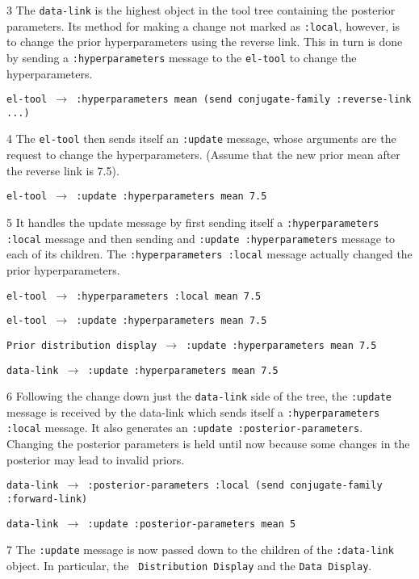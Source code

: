 \item{3} The {\tt data-link\/} is the highest object in the tool tree
containing the posterior parameters.  Its method for making a change
not marked as {\tt :local\/}, however, is to change the prior
hyperparameters using the reverse link.  This in turn is done by
sending a {\tt :hyperparameters\/} message to the {\tt el-tool\/} to
change the hyperparameters.

{\tt el-tool $\rightarrow$ :hyperparameters mean (send conjugate-family
:reverse-link ...)}

\item{4} The {\tt el-tool\/} then sends itself an {\tt :update\/}
message, whose arguments are the request to change 
the hyperparameters.  (Assume that the new prior mean after the
reverse link is 7.5).

{\tt el-tool $\rightarrow$ :update :hyperparameters mean 7.5}


\item{5} It handles the update message by first sending
itself a {\tt :hyperparameters :local\/} message and then sending and
{\tt :update :hyperparameters\/} message to each of its children.  The
{\tt :hyperparameters :local\/} message actually changed the prior
hyperparameters.  

{\tt el-tool $\rightarrow$ :hyperparameters :local mean 7.5}\par
{\tt el-tool $\rightarrow$ :update :hyperparameters mean 7.5}\par
{\tt Prior distribution display $\rightarrow$ :update :hyperparameters mean 7.5}\par
{\tt data-link $\rightarrow$ :update :hyperparameters mean 7.5}\par

\item{6} Following the change down just the {\tt data-link} side of
the tree, the {\tt :update\/} message is
received by the data-link which sends itself a {\tt :hyperparameters
:local\/} message.  It also generates an {\tt :update
:posterior-parameters\/}.  Changing the posterior parameters is held
until now because some changes in the posterior may lead to invalid
priors.  

{\tt data-link $\rightarrow$ :posterior-parameters :local (send
conjugate-family :forward-link)}\par
{\tt data-link $\rightarrow$ :update :posterior-parameters mean 5}

\item{7} The {\tt :update\/} message is now passed down to the
children of the {\tt :data-link\/} object.  In particular, the {\tt
Distribution Display\/} and the {\tt Data Display\/}.  

